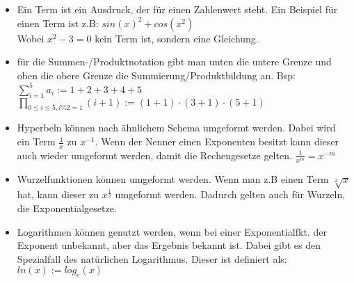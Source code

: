 \begin{framed} [Zusammenfassung]
  \begin{itemize}
    \item
      Ein Term ist ein Ausdruck, der für einen Zahlenwert steht. Ein Beispiel für 
      einen Term ist z.B: $sin(x)^2 + cos(x^2)$\\
      Wobei $x^2 - 3 = 0$ kein Term ist, sondern eine Gleichung.

    \item
      für die Summen-/Produktnotation gibt man unten die untere Grenze und oben 
      die obere Grenze die Summierung/Produktbildung an. Bsp:\\
      $\sum_{i=1}^{5}a_i := 1 + 2 + 3 + 4 + 5$\\
      $\prod_{0\leq i\leq 5, i\%2=1}^{} (i + 1):= (1 + 1) \cdot (3 + 1) 
      \cdot (5 + 1)$

    \item
      Hyperbeln können nach ähnlichem Schema umgeformt werden. Dabei wird ein Term 
      $\frac{1}{x}$ zu $x^{-1}$. Wenn der Nenner einen Exponenten besitzt kann 
      dieser auch wieder umgeformt werden, damit die Rechengesetze gelten.	
      $\frac{1}{x^m} = x^{-m}$

    \item
      Wurzelfunktionen können umgeformt werden. Wenn man z.B einen Term
      $\sqrt[2]{x}$ hat, kann dieser zu $x^\frac{1}{2}$ umgeformt werden. Dadurch
      gelten auch für Wurzeln, die Exponentialgesetze.	

    \item
      Logarithmen können genutzt werden, wenn bei einer Exponentialfkt. der 
      Exponent unbekannt, aber das Ergebnis bekannt ist. Dabei gibt es den 
      Spezialfall des natürlichen Logarithmus. Dieser ist definiert als:\\
      $ln(x) := log_e(x)$
  \end{itemize}
\end{framed}











%		
%		
